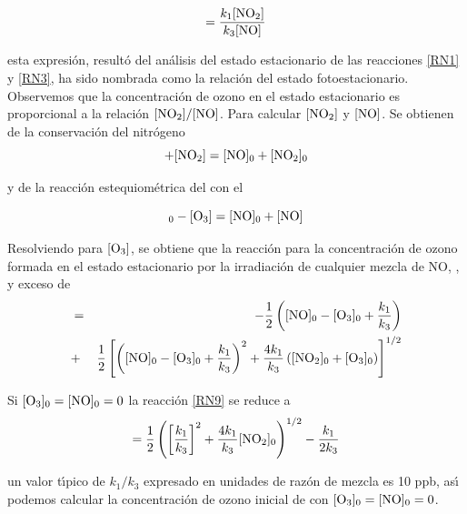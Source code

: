 \begin{equation}
[\ce{O3}]=\frac{k_1[\ce{NO2}]}{k_3[\ce{NO}]}
\label{RN8}
\end{equation}

esta expresi\'on, result\'o del an\'alisis del estado estacionario de las reacciones \ref{RN1} y \ref{RN3}, ha sido nombrada como la relaci\'on del estado fotoestacionario. Observemos que la concentraci\'on de ozono en el estado estacionario es proporcional a la relaci\'on $[\ce{NO2}]/[\ce{NO}]$. Para calcular  $[\ce{NO2}]$ y $[\ce{NO}]$. Se obtienen de la conservaci\'on del nitr\'ogeno
\begin{equation*}
[\ce{NO}] + [\ce{NO2}] = [\ce{NO}]_0 + [\ce{NO2}]_0
\end{equation*}

y de la reacci\'on estequiom\'etrica del  con el 

\begin{equation*}
[\ce{O3}]_0 - [\ce{O3}] = [\ce{NO}]_0 + [\ce{NO}]
\end{equation*}

Resolviendo para $[\ce{O3}]$, se obtiene que la reacci\'on para la concentraci\'on de ozono formada en el estado estacionario por la irradiaci\'on de cualquier mezcla de NO, ,  y exceso de 
\begin{eqnarray}
 [\ce{O3}]&=&-\frac{1}{2}\left([\ce{NO}]_0-[\ce{O3}]_0+\frac{k_1}{k_3}\right) \nonumber\\
  &+&\frac{1}{2}\left[\left([\ce{NO}]_0-[\ce{O3}]_0+\frac{k_1}{k_3}\right)^2+\frac{4k_1}{k_3} \left([\ce{NO2}]_0+[\ce{O3}]_0\right)\right]^{1/2}
\label{RN9}
\end{eqnarray}

Si $[\ce{O3}]_0=[\ce{NO}]_0=0$ la reacci\'on \ref{RN9} se reduce a 
\begin{equation}
 [\ce{O3}]=\frac{1}{2}\left(\left[\frac{k_1}{k_3}\right]^2+\frac{4k_1}{k_3} [\ce{NO2}]_0\right)^{1/2} -\frac{k_1}{2k_3}
\label{RN10}
\end{equation}

un valor t\'{\i}pico de $k_1/k_3$ expresado en unidades de raz\'on de mezcla es 10 ppb, as\'{\i} podemos calcular la concentraci\'on de ozono inicial de  con   $[\ce{O3}]_0=[\ce{NO}]_0=0$.

